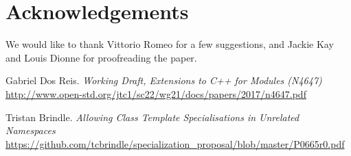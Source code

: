 \documentclass[reqno]{article}
\begin{document}
\section{Acknowledgements}
We would like to thank Vittorio Romeo for a few suggestions, and Jackie Kay and
Louis Dionne for proofreading the paper.



\begin{thebibliography}{9}

    Gabriel Dos Reis.
        \textit{Working Draft, Extensions to C++ for Modules (N4647)}
        \url{http://www.open-std.org/jtc1/sc22/wg21/docs/papers/2017/n4647.pdf}

    Tristan Brindle.
        \textit{Allowing Class Template Specialisations in Unrelated Namespaces}
        \url{https://github.com/tcbrindle/specialization_proposal/blob/master/P0665r0.pdf}

\end{thebibliography}
\end{document}
